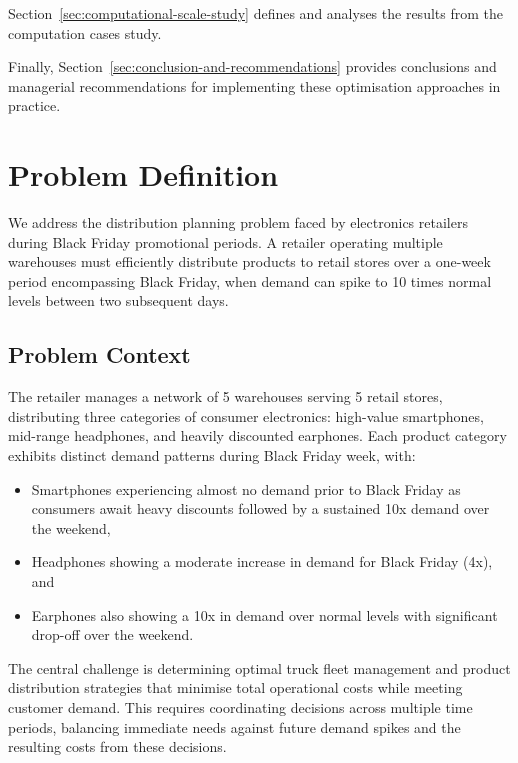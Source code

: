 \documentclass[a4paper,12pt]{article}
\begin{document}
Section~\ref{sec:computational-scale-study} defines and analyses the results from the computation cases study.

Finally, Section~\ref{sec:conclusion-and-recommendations} provides conclusions and managerial recommendations for implementing these optimisation approaches in practice.





\section{Problem Definition}\label{sec:problem-definition}

We address the distribution planning problem faced by electronics retailers during Black Friday promotional periods.
A retailer operating multiple warehouses must efficiently distribute products to retail stores over a one-week period encompassing Black Friday, when demand can spike to 10 times normal levels between two subsequent days.

\subsection{Problem Context}\label{subsec:problem-context}

The retailer manages a network of 5 warehouses serving 5 retail stores, distributing three categories of consumer electronics: high-value smartphones, mid-range headphones, and heavily discounted earphones.
Each product category exhibits distinct demand patterns during Black Friday week, with:

\begin{itemize}
    \item Smartphones experiencing almost no demand prior to Black Friday as consumers await heavy discounts followed by a sustained 10x demand over the weekend,
    \item Headphones showing a moderate increase in demand for Black Friday (4x), and
    \item Earphones also showing a 10x in demand over normal levels with significant drop-off over the weekend.
\end{itemize}

The central challenge is determining optimal truck fleet management and product distribution strategies that minimise total operational costs while meeting customer demand.
This requires coordinating decisions across multiple time periods, balancing immediate needs against future demand spikes and the resulting costs from these decisions.
\end{document}
